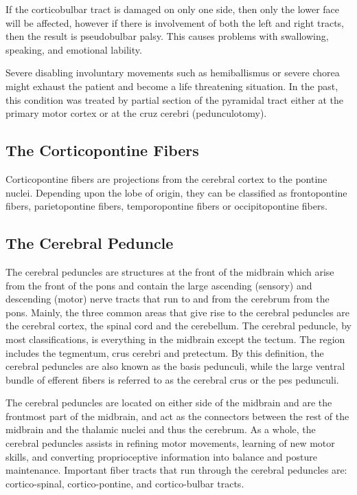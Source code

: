If the corticobulbar tract is damaged on only one side, then only the lower face will be affected, however if there is involvement of both the left and right tracts, then the result is pseudobulbar palsy. This causes problems with swallowing, speaking, and emotional lability.

Severe disabling involuntary movements such as hemiballismus or severe chorea might exhaust the patient and become a life threatening situation. In the past, this condition was treated by partial section of the pyramidal tract either at the primary motor cortex or at the cruz cerebri (pedunculotomy).

\hypertarget{the-corticopontine-fibers}{%
\subsection{The Corticopontine Fibers}\label{the-corticopontine-fibers}}

Corticopontine fibers are projections from the cerebral cortex to the pontine nuclei. Depending upon the lobe of origin, they can be classified as frontopontine fibers, parietopontine fibers, temporopontine fibers or occipitopontine fibers.

\hypertarget{the-cerebral-peduncle}{%
\subsection{The Cerebral Peduncle}\label{the-cerebral-peduncle}}

The cerebral peduncles are structures at the front of the midbrain which arise from the front of the pons and contain the large ascending (sensory) and descending (motor) nerve tracts that run to and from the cerebrum from the pons. Mainly, the three common areas that give rise to the cerebral peduncles are the cerebral cortex, the spinal cord and the cerebellum. The cerebral peduncle, by most classifications, is everything in the midbrain except the tectum. The region includes the tegmentum, crus cerebri and pretectum. By this definition, the cerebral peduncles are also known as the basis pedunculi, while the large ventral bundle of efferent fibers is referred to as the cerebral crus or the pes pedunculi.

The cerebral peduncles are located on either side of the midbrain and are the frontmost part of the midbrain, and act as the connectors between the rest of the midbrain and the thalamic nuclei and thus the cerebrum. As a whole, the cerebral peduncles assists in refining motor movements, learning of new motor skills, and converting proprioceptive information into balance and posture maintenance. Important fiber tracts that run through the cerebral peduncles are: cortico-spinal, cortico-pontine, and cortico-bulbar tracts.

